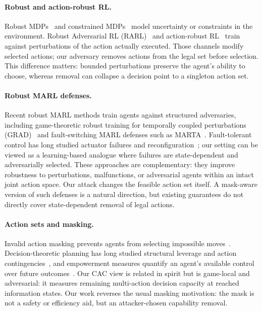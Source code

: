 \documentclass{article}
\begin{document}
\paragraph{Robust and action-robust RL.}
Robust MDPs~\citep{iyengar2005robust,nilim2005robust} and constrained MDPs~\citep{altman1999constrained} model uncertainty or constraints in the environment. Robust Adversarial RL (RARL)~\citep{pinto2017robust} and action-robust RL~\citep{tessler2019action} train against perturbations of the action actually executed. Those channels modify selected actions; our adversary removes actions from the legal set before selection. This difference matters: bounded perturbations preserve the agent's ability to choose, whereas removal can collapse a decision point to a singleton action set.

\paragraph{Robust MARL defenses.}
Recent robust MARL methods train agents against structured adversaries, including game-theoretic robust training for temporally coupled perturbations (GRAD)~\citep{liang2024grad} and fault-switching MARL defenses such as MARTA~\citep{mguni2025marta}. Fault-tolerant control has long studied actuator failures and reconfiguration~\citep{blanke2006fault}; our setting can be viewed as a learning-based analogue where failures are state-dependent and adversarially selected. These approaches are complementary: they improve robustness to perturbations, malfunctions, or adversarial agents within an intact joint action space. Our attack changes the feasible action set itself. A mask-aware version of such defenses is a natural direction, but existing guarantees do not directly cover state-dependent removal of legal actions.

\paragraph{Action sets and masking.}
Invalid action masking prevents agents from selecting impossible moves~\citep{huang2022closer}. Decision-theoretic planning has long studied structural leverage and action contingencies~\citep{boutilier1999decision}, and empowerment measures quantify an agent's available control over future outcomes~\citep{klyubin2005empowerment}. Our CAC view is related in spirit but is game-local and adversarial: it measures remaining multi-action decision capacity at reached information states. Our work reverses the usual masking motivation: the mask is not a safety or efficiency aid, but an attacker-chosen capability removal.
\end{document}
